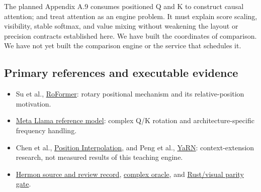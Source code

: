 The planned Appendix A.9 consumes positioned Q and K to construct causal
attention;  and  treat attention
as an engine problem. It must explain score scaling, visibility, stable softmax,
and value mixing without weakening the layout or precision contracts
established here. We have built the coordinates of comparison. We have
not yet built the comparison engine or the service that schedules it.

\subsection{Primary references and executable
evidence}\label{primary-references-and-executable-evidence}

\begin{itemize}
\tightlist
\item
  Su et al., \href{https://arxiv.org/html/2104.09864v5}{RoFormer}:
  rotary positional mechanism and its relative-position motivation.
\item
  \href{https://raw.githubusercontent.com/meta-llama/llama-models/main/models/llama3/model.py}{Meta
  Llama reference model}: complex Q/K rotation and architecture-specific
  frequency handling.
\item
  Chen et al., \href{https://arxiv.org/abs/2306.15595}{Position
  Interpolation}, and Peng et al.,
  \href{https://arxiv.org/abs/2309.00071}{YaRN}: context-extension
  research, not measured results of this teaching engine.
\item
  \href{https://github.com/hermonai/inside-the-llm-engine/blob/astra-visual-rewrite/research/part-02/chapter-09-position-rope.md}{Hermon
  source and review record},
  \href{https://github.com/hermonai/inside-the-llm-engine/blob/astra-visual-rewrite/code/reference/python/chapter09_rope_oracle.py}{complex
  oracle}, and
  \href{https://github.com/hermonai/inside-the-llm-engine/blob/astra-visual-rewrite/scripts/check-rope-visual-parity.py}{Rust/visual
  parity gate}.
\end{itemize}

